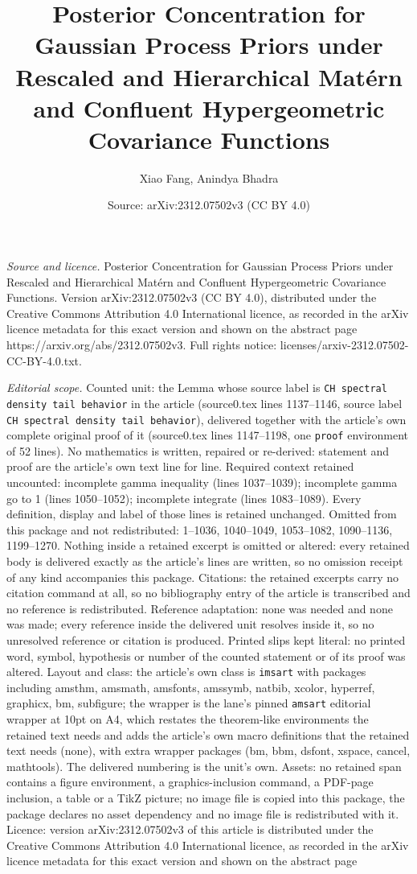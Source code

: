 \documentclass[10pt,a4paper]{amsart}
\title[Posterior Concentration for Gaussian Process Priors under Re]{Posterior Concentration for Gaussian Process Priors under Rescaled and Hierarchical Mat\'ern and Confluent Hypergeometric Covariance Functions}
\author{Xiao Fang, Anindya Bhadra}
\date{Source: arXiv:2312.07502v3 (CC BY 4.0)}
\begin{document}
\maketitle

\noindent\emph{Source and licence.} Posterior Concentration for Gaussian Process Priors under Rescaled and Hierarchical Mat\'ern and Confluent Hypergeometric Covariance Functions. Version arXiv:2312.07502v3 (CC BY 4.0), distributed under the Creative Commons Attribution 4.0 International licence, as recorded in the arXiv licence metadata for this exact version and shown on the abstract page https://arxiv.org/abs/2312.07502v3. Full rights notice: licenses/arxiv-2312.07502-CC-BY-4.0.txt.\par\smallskip

\noindent\textit{Editorial scope.} Counted unit: the Lemma whose source label is \texttt{CH spectral density tail behavior} in the article (source0.tex lines 1137--1146, source label \texttt{CH spectral density tail behavior}), delivered together with the article's own complete original proof of it (source0.tex lines 1147--1198, one \texttt{proof} environment of 52 lines). No mathematics is written, repaired or re-derived: statement and proof are the article's own text line for line. Required context retained uncounted: incomplete gamma inequality (lines 1037--1039); incomplete gamma go to 1 (lines 1050--1052); incomplete integrate (lines 1083--1089). Every definition, display and label of those lines is retained unchanged. Omitted from this package and not redistributed: 1--1036, 1040--1049, 1053--1082, 1090--1136, 1199--1270. Nothing inside a retained excerpt is omitted or altered: every retained body is delivered exactly as the article's lines are written, so no omission receipt of any kind accompanies this package. Citations: the retained excerpts carry no citation command at all, so no bibliography entry of the article is transcribed and no reference is redistributed. Reference adaptation: none was needed and none was made; every reference inside the delivered unit resolves inside it, so no unresolved reference or citation is produced. Printed slips kept literal: no printed word, symbol, hypothesis or number of the counted statement or of its proof was altered. Layout and class: the article's own class is \texttt{imsart} with packages including amsthm, amsmath, amsfonts, amssymb, natbib, xcolor, hyperref, graphicx, bm, subfigure; the wrapper is the lane's pinned \texttt{amsart} editorial wrapper at 10pt on A4, which restates the theorem-like environments the retained text needs and adds the article's own macro definitions that the retained text needs (none), with extra wrapper packages (bm, bbm, dsfont, xspace, cancel, mathtools). The delivered numbering is the unit's own. Assets: no retained span contains a figure environment, a graphics-inclusion command, a PDF-page inclusion, a table or a TikZ picture; no image file is copied into this package, the package declares no asset dependency and no image file is redistributed with it. Licence: version arXiv:2312.07502v3 of this article is distributed under the Creative Commons Attribution 4.0 International licence, as recorded in the arXiv licence metadata for this exact version and shown on the abstract page 
\end{document}
